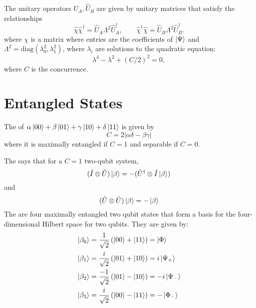 \documentclass{article}
\numberwithin{equation}{section}
\begin{document}
The unitary operators $\hat{U}_A,\hat{U}_B$ are given by unitary matrices that satisfy the relationships  
\begin{equation}
    \hat{\chi}\hat{\chi}^\dagger = \hat{U}_A\Lambda^2\hat{U}_A^\dagger,\quad\quad \hat{\chi}^\dagger\hat{\chi} = \hat{U}_B\Lambda^2\hat{U}_B^\dagger.
\end{equation}
where $\chi$ is a matrix where entries are the coefficients of $\ket{\Psi}$ and $\Lambda^2 = \text{diag}(\lambda_0^2,\lambda_1^2)$, where $\lambda_i$ are solutions to the quadratic equation:
\begin{equation}
    \lambda^4 - \lambda^2 + (C/2)^2 = 0,
\end{equation}
where $C$ is the concurrence.
\section{Entangled States}
The  of $\alpha \ket{00} + \beta\ket{01} + \gamma\ket{10} + \delta\ket{11}$ is given by
\begin{equation}
    C = 2|\alpha\delta - \beta\gamma|
\end{equation}
where it is maximally entangled if $C = 1$ and separable if $C = 0$.

The  says that for a $C = 1$ two-qubit system,
\begin{equation}
    (\hat{I} \otimes \hat{U})\ket{\beta} = -(\hat{U}^\dagger \otimes \hat{I} \ket{\beta})
\end{equation}
and 
\begin{equation}
    (\hat{U} \otimes \hat{U})\ket{\beta} = -\ket{\beta}
\end{equation}
The  are four maximally entangled two qubit states that form a basis for the four-dimensional Hilbert space for two qubits. They are given by:
\begin{align*}
    \ket{\beta_0} &= \frac{1}{\sqrt 2}\left(\ket{00}+\ket{11}\right) = \ket{\Phi}\\ 
    \ket{\beta_1} &= \frac{i}{\sqrt 2}\left(\ket{01}+\ket{10}\right) = i\ket{\Psi_+}\\
    \ket{\beta_2} &= \frac{-1}{\sqrt 2}\left(\ket{01}-\ket{10}\right) = -i\ket{\Psi_-}\\
    \ket{\beta_3} &= \frac{i}{\sqrt 2}\left(\ket{00}-\ket{11}\right) = -\ket{\Phi_-}
\end{align*}
\end{document}
